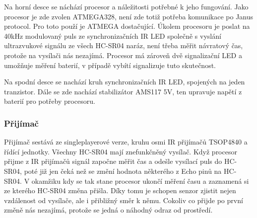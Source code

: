 Na horní desce se náchází procesor a náležitosti potřebné k jeho fungování.
Jako procesor je zde zvolen ATMEGA328, není zde totiž potřeba komunikace po Janus protocol.
Pro toto použí je ATMEGA dostačující.
Úkolem procesoru je poslat na 40kHz modulovaný puls ze synchronizačních IR LED společně s vyslání ultrazvukové signálu ze všech HC-SR04 naráz, není třeba měřit návratový čas, protože na vysílači nás nezajímá.
Procesor má zároveň dvě signalizační LED a umožňuje měření baterií, v případě vybítí signalizuje tuto skutečnost.

Na spodní desce se nachází kruh synchronizačních IR LED, spojených na jeden tranzistor.
Dále se zde nachází stabilizátor AMS117 5V, ten upravuje napětí z baterií pro potřeby procesoru.

\subsubsection{Přijímač}
Přijímač sestává ze singleplayerové verze, kruhu osmi IR přijímačů TSOP4840 a řídící jednotky.
Všechny HC-SR04 mají znefunkčněný vysílač.
Když procesor přijme z IR přijímačů signál započne měřit čas a odešle vysílací puls do HC-SR04, poté již jen čeká než se změní hodnota některého z Echo pinů na HC-SR04.
V okamžiku kdy se tak stane procesor ukončí měření času a zaznamená si ze kterého HC-SR04 změna přišla.
Díky tomu je schopen senzor zjistit nejen vzdálenost od vysílače, ale i přibližný směr k němu.
Cokoliv co přijde po první změně nás nezajímá, protože se jedná o náhodný odraz od prostředí. 
